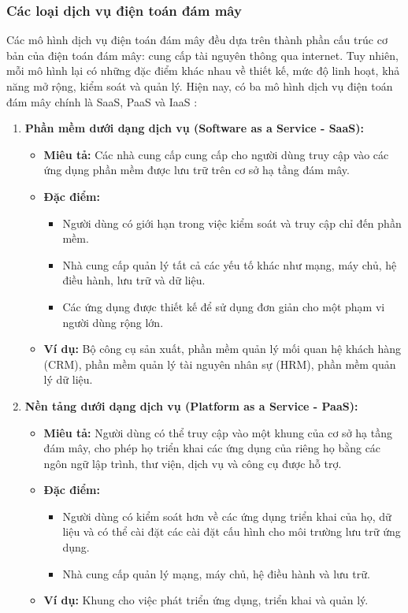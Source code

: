 \subsubsection{Các loại dịch vụ điện toán đám mây}
Các mô hình dịch vụ điện toán đám mây đều dựa trên thành phần cấu trúc cơ bản của điện toán đám mây: cung cấp tài nguyên thông qua internet. Tuy nhiên, mỗi mô hình lại có những đặc điểm khác nhau về thiết kế, mức độ linh hoạt, khả năng mở rộng, kiểm soát và quản lý. Hiện nay, có ba mô hình dịch vụ điện toán đám mây chính là SaaS, PaaS và IaaS \cite{hpe_cloud_services}:
\begin{enumerate}
\item \textbf{Phần mềm dưới dạng dịch vụ (Software as a Service - SaaS):}
\begin{itemize}
\item \textbf{Miêu tả:} Các nhà cung cấp cung cấp cho người dùng truy cập vào các ứng dụng phần mềm được lưu trữ trên cơ sở hạ tầng đám mây.
    \item \textbf{Đặc điểm:}
        \begin{itemize}
            \item Người dùng có giới hạn trong việc kiểm soát và truy cập chỉ đến phần mềm.
            \item Nhà cung cấp quản lý tất cả các yếu tố khác như mạng, máy chủ, hệ điều hành, lưu trữ và dữ liệu.
            \item Các ứng dụng được thiết kế để sử dụng đơn giản cho một phạm vi người dùng rộng lớn.
        \end{itemize}
        \item \textbf{Ví dụ:} Bộ công cụ sản xuất, phần mềm quản lý mối quan hệ khách hàng (CRM), phần mềm quản lý tài nguyên nhân sự (HRM), phần mềm quản lý dữ liệu.
    \end{itemize}

    \item \textbf{Nền tảng dưới dạng dịch vụ (Platform as a Service - PaaS):}
    \begin{itemize}
        \item \textbf{Miêu tả:} Người dùng có thể truy cập vào một khung của cơ sở hạ tầng đám mây, cho phép họ triển khai các ứng dụng của riêng họ bằng các ngôn ngữ lập trình, thư viện, dịch vụ và công cụ được hỗ trợ.
        \item \textbf{Đặc điểm:}
        \begin{itemize}
            \item Người dùng có kiểm soát hơn về các ứng dụng triển khai của họ, dữ liệu và có thể cài đặt các cài đặt cấu hình cho môi trường lưu trữ ứng dụng.
            \item Nhà cung cấp quản lý mạng, máy chủ, hệ điều hành và lưu trữ.
        \end{itemize}
        \item \textbf{Ví dụ:} Khung cho việc phát triển ứng dụng, triển khai và quản lý.
    \end{itemize}


\end{enumerate}
